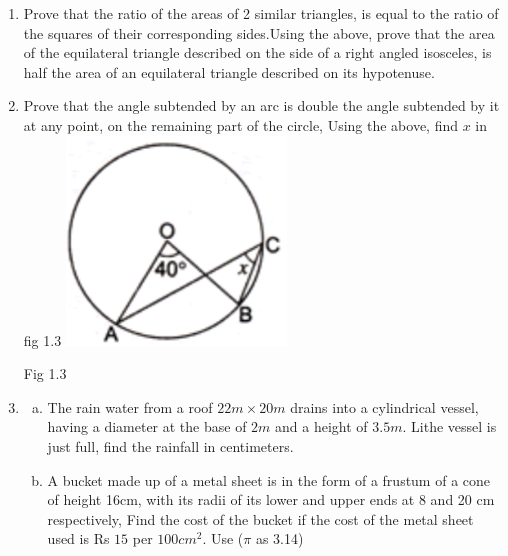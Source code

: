\documentclass[journal,12pt,twocolumn]{IEEEtran}
\begin{document}
\begin{enumerate}[label=1.\arabic*]
\begin{enumerate}[label=2.\arabic*]
\begin{enumerate}[label=3.\arabic*]
\item Prove that the ratio of the areas of 2 similar triangles, is equal to the ratio
of the squares of their corresponding sides.Using the above, prove that the area of the
equilateral triangle described on the side of a right angled isosceles, is half the area
of an equilateral triangle described on its hypotenuse.\\
\item Prove that the angle subtended by an arc is double the angle subtended by it at any 
point, on the remaining part of the circle, Using the above, find $x$ in fig 1.3
\includegraphics[scale = 0.75]{fig 1.3}\\
\begin{flushright}
Fig 1.3\\
\end{flushright}
\vspace{2mm}
\item \begin{enumerate}[a)]
\item The rain water from a roof $22m \times 20m$ drains into a cylindrical vessel, having a diameter at the base of $2m$ and a height of $3.5m$. Lithe vessel is just full, find the rainfall in centimeters.\\
\item A bucket made up of a metal sheet is in the form of a frustum of a cone of height 16cm, with its radii of its lower and upper ends at 8 and 20 cm respectively, Find the cost of the bucket if the cost of the metal sheet used is Rs $15$ per $100 cm^2$. Use ($\pi$ as 3.14)\\
\end{enumerate}


\end{enumerate}
\end{enumerate}
\end{enumerate}
\end{document}
